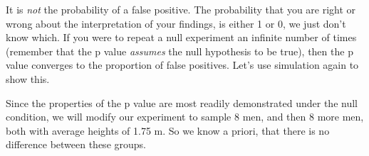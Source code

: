 \documentclass[
]{article}
\newenvironment{Shaded}{\begin{snugshade}}{\end{snugshade}}
\newcommand{\AttributeTok}[1]{\textcolor[rgb]{0.77,0.63,0.00}{#1}}
\newcommand{\ConstantTok}[1]{\textcolor[rgb]{0.00,0.00,0.00}{#1}}
\newcommand{\ControlFlowTok}[1]{\textcolor[rgb]{0.13,0.29,0.53}{\textbf{#1}}}
\newcommand{\DecValTok}[1]{\textcolor[rgb]{0.00,0.00,0.81}{#1}}
\newcommand{\FloatTok}[1]{\textcolor[rgb]{0.00,0.00,0.81}{#1}}
\newcommand{\FunctionTok}[1]{\textcolor[rgb]{0.00,0.00,0.00}{#1}}
\newcommand{\NormalTok}[1]{#1}
\newcommand{\OtherTok}[1]{\textcolor[rgb]{0.56,0.35,0.01}{#1}}
\newcommand{\SpecialCharTok}[1]{\textcolor[rgb]{0.00,0.00,0.00}{#1}}
\begin{document}
It is \emph{not} the probability of a false positive. The probability
that you are right or wrong about the interpretation of your findings,
is either 1 or 0, we just don't know which. If you were to repeat a null
experiment an infinite number of times (remember that the p value
\emph{assumes} the null hypothesis to be true), then the p value
converges to the proportion of false positives. Let's use simulation
again to show this.

Since the properties of the p value are most readily demonstrated under
the null condition, we will modify our experiment to sample 8 men, and
then 8 more men, both with average heights of 1.75 m. So we know a
priori, that there is no difference between these groups.

\begin{Shaded}
\end{Shaded}
\end{document}
